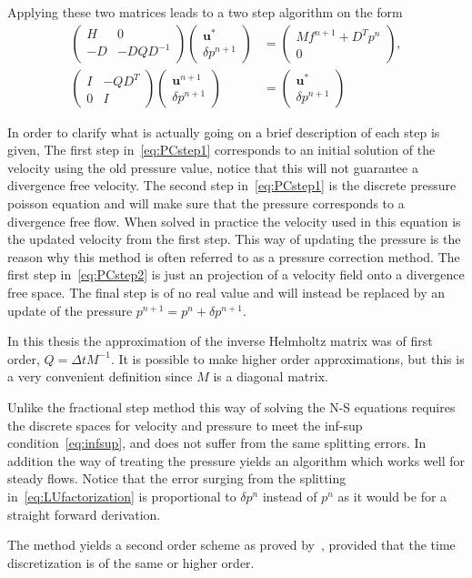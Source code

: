 Applying these two matrices leads to a two step algorithm on the form 
\begin{align}
\begin{pmatrix}
    H & 0 \\ 
    -D & -DQD^{-1}
\end{pmatrix}
\begin{pmatrix}
    \mathbf{u}^{*}  \\ 
    \delta p^{n+1} 
\end{pmatrix}
&=
\begin{pmatrix}
    Mf^{n+1} +D^Tp^n  \\ 
    0 
    \end{pmatrix}
    \label{eq:PCstep1}
    ,\\
\begin{pmatrix}
    I & -QD^T \\ 
    0 & I
\end{pmatrix}
\begin{pmatrix}
    \mathbf{u}^{n+1}  \\ 
    \delta p^{n+1} 
\end{pmatrix}
&=
\begin{pmatrix}
    \mathbf{u}^{*}  \\ 
    \delta p^{n+1} 
\end{pmatrix}
    \label{eq:PCstep2}
\end{align}

In order to clarify what is actually going on a brief description of each step is given,
The first step in~\ref{eq:PCstep1} corresponds to an initial solution of the velocity using 
the old pressure value, notice that this will not guarantee a divergence free velocity.
The second step in~\ref{eq:PCstep1} is the discrete pressure poisson equation and will 
make sure that the pressure corresponds to a divergence free flow. When solved in practice 
the velocity used in this equation is the updated velocity from the first step. This way of 
updating the pressure is the reason why this method is often referred to as a pressure 
correction method.
The first step in~\ref{eq:PCstep2} is just an projection of a velocity field
onto a divergence free space. The final step is of no real value and will instead be replaced 
by an update of the pressure $p^{n+1} = p^{n}+\delta p^{n+1}$.

In this thesis the approximation of the inverse Helmholtz matrix was of first order, 
$Q = \Delta t M^{-1}$. It is possible to make higher order approximations, but this is 
a very convenient definition since $M$ is a diagonal matrix.

Unlike the fractional step method this way of solving the N-S equations  
requires the discrete spaces for velocity and pressure
to meet the inf-sup condition~\ref{eq:infsup}, and does not suffer from the same splitting 
errors. In addition the way of treating the pressure yields an algorithm which works well 
for steady flows. Notice that the error surging 
from the splitting in~\ref{eq:LUfactorization} is proportional to $\delta p^n$ instead of $p^n$
as it would be for a straight forward derivation. 

The method yields a second order scheme 
as proved by~\cite{vanKan}, provided that the time discretization is of the same or higher order.

